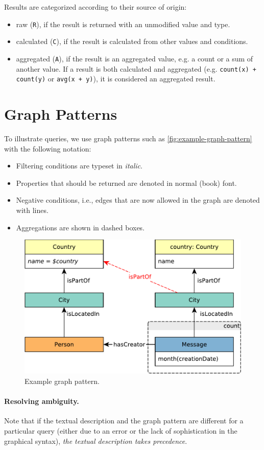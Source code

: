 
Results are categorized according to their source of origin:

\begin{itemize}
	\item raw (\texttt{R}), if the result is returned with an unmodified value and type.
	\item calculated (\texttt{C}), if the result is calculated from other values and conditions.
	\item aggregated (\texttt{A}), if the result is an aggregated value, e.g. a count or a sum of another value. If a result is both calculated and aggregated (e.g. \texttt{count(x) + count(y)} or \texttt{avg(x + y)}), it is considered an aggregated result.
\end{itemize}



\section{Graph Patterns}

To illustrate queries, we use graph patterns such as \autoref{fig:example-graph-pattern} with the following notation:

\begin{itemize}
	\item Filtering conditions are typeset in \textit{italic}.
	\item Properties that should be returned are denoted in normal (book) font.
	\item Negative conditions, i.e., edges that are now allowed in the graph are denoted with \textcolor{red}{} lines.
	\item Aggregations are shown in dashed boxes.
\end{itemize}

\begin{figure}[hbp]
	\begin{center}
		\includegraphics[scale=\patternscale,margin=0cm .2cm]{patterns/bi-read-23}
		\caption{Example graph pattern.}
		\label{fig:example-graph-pattern}
	\end{center}
\end{figure}

\paragraph{Resolving ambiguity.} Note that if the textual description and the graph pattern are different for a particular query (either due to an error or the lack of sophistication in the graphical syntax), \emph{the textual description takes precedence}.
